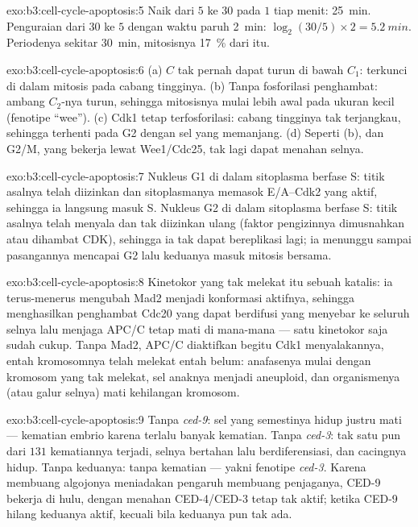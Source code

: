 \begin{solution}{exo:b3:cell-cycle-apoptosis:5}
Naik dari $5$ ke $30$ pada $1$ tiap menit: \qty{25}{min}. Penguraian dari
$30$ ke $5$ dengan waktu paruh \qty{2}{min}: $\log_{2}(30/5)\times 2 =
\qty{5.2}{min}$. Periodenya sekitar \qty{30}{min}, mitosisnya \qty{17}{\%} dari itu.
\end{solution}

\begin{solution}{exo:b3:cell-cycle-apoptosis:6}
(a) $C$ tak pernah dapat turun di bawah $C_{1}$: terkunci di dalam mitosis pada
cabang tingginya. (b) Tanpa fosforilasi penghambat: ambang $C_{2}$-nya
turun, sehingga mitosisnya mulai lebih awal pada ukuran kecil (fenotipe
``wee''). (c) Cdk1 tetap terfosforilasi: cabang tingginya tak terjangkau,
sehingga terhenti pada G2 dengan sel yang memanjang. (d) Seperti (b), dan
 G2/M, yang bekerja lewat Wee1/Cdc25, tak lagi dapat menahan selnya.
\end{solution}

\begin{solution}{exo:b3:cell-cycle-apoptosis:7}
Nukleus G1 di dalam sitoplasma berfase S: titik asalnya telah diizinkan dan
sitoplasmanya memasok  E/A--Cdk2 yang aktif, sehingga ia langsung masuk
S. Nukleus G2 di dalam sitoplasma berfase S: titik asalnya telah menyala dan
tak diizinkan ulang (faktor pengizinnya dimusnahkan atau dihambat CDK),
sehingga ia tak dapat bereplikasi lagi; ia menunggu sampai pasangannya mencapai
G2 lalu keduanya masuk mitosis bersama.
\end{solution}

\begin{solution}{exo:b3:cell-cycle-apoptosis:8}
Kinetokor yang tak melekat itu sebuah katalis: ia terus-menerus mengubah Mad2
menjadi konformasi aktifnya, sehingga menghasilkan penghambat Cdc20 yang dapat
berdifusi yang menyebar ke seluruh selnya lalu menjaga APC/C tetap mati di
mana-mana --- satu kinetokor saja sudah cukup. Tanpa Mad2, APC/C diaktifkan
begitu Cdk1 menyalakannya, entah kromosomnya telah melekat entah belum:
anafasenya mulai dengan kromosom yang tak melekat, sel anaknya menjadi
aneuploid, dan organismenya (atau galur selnya) mati kehilangan kromosom.
\end{solution}

\begin{solution}{exo:b3:cell-cycle-apoptosis:9}
Tanpa \emph{ced-9}: sel yang semestinya hidup justru mati --- kematian embrio
karena terlalu banyak kematian. Tanpa \emph{ced-3}: tak satu pun dari $131$
kematiannya terjadi, selnya bertahan lalu berdiferensiasi, dan cacingnya hidup.
Tanpa keduanya: tanpa kematian --- yakni fenotipe \emph{ced-3}. Karena
membuang algojonya meniadakan pengaruh membuang penjaganya, CED-9 bekerja di
hulu, dengan menahan CED-4/CED-3 tetap tak aktif; ketika CED-9 hilang keduanya
aktif, kecuali bila keduanya pun tak ada.
\end{solution}

